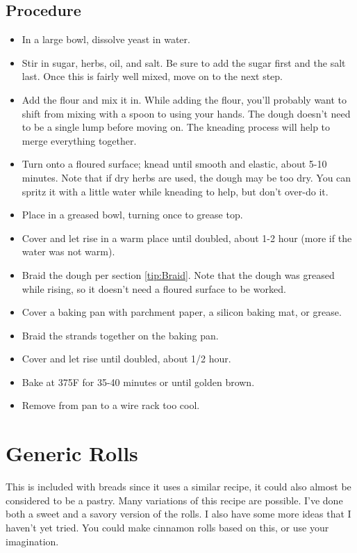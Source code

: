 \documentclass[10pt, openany]{book}
\begin{document}
\subsection{Procedure}
\begin{itemize}
  \item In a large bowl, dissolve yeast in water.
  \item Stir in sugar, herbs, oil, and salt.  Be sure to add the sugar first and the salt last.  Once this is fairly well mixed, move on to the next step.
  \item Add the flour and mix it in.  While adding the flour, you'll probably want to shift from mixing with a spoon to using your hands.  The dough doesn't need to be a single lump before moving on.  The kneading process will help to merge everything together.
  \item Turn onto a floured surface; knead until smooth and elastic, about 5-10 minutes.  Note that if dry herbs are used, the dough may be too dry.  You can spritz it with a little water while kneading to help, but don't over-do it.
  \item Place in a greased bowl, turning once to grease top.
  \item Cover and let rise in a warm place until doubled, about 1-2 hour (more if the water was not warm).
  \item Braid the dough per section \ref{tip:Braid}.  Note that the dough was greased while rising, so it doesn't need a floured surface to be worked.
  \item Cover a baking pan with parchment paper, a silicon baking mat, or grease.
  \item Braid the strands together on the baking pan.
  \item Cover and let rise until doubled, about 1/2 hour.
  \item Bake at 375\degree{}F for 35-40 minutes or until golden brown.
  \item Remove from pan to a wire rack too cool.
\end{itemize}

\section{Generic Rolls}
\label{bread:Rolls}
This is included with breads since it uses a similar recipe, it could also almost be considered to be a pastry.  Many variations of this recipe are possible.  I've done both a sweet and a savory version of the rolls.  I also have some more ideas that I haven't yet tried.  You could make cinnamon rolls based on this, or use your imagination.
\end{document}
